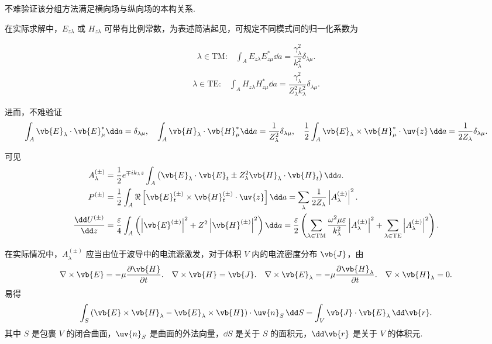 不难验证该分组方法满足横向场与纵向场的本构关系.

在实际求解中，\(E_{z\lambda}\) 或 \(H_{z\lambda}\) 可带有比例常数，为表述简洁起见，可规定不同模式间的归一化系数为

\begin{align*}
	\lambda\in\text{TM:}\quad\int_A E_{z\lambda} E_{z\mu}^* \dd a = \dfrac{\gamma_{\lambda}^2}{k_{\lambda}^2} \delta_{\lambda\mu}.
\end{align*}
\begin{align*}
	\lambda\in\text{TE:}\quad\int_A H_{z\lambda} H_{z\mu}^* \dd a = \dfrac{\gamma_{\lambda}^2}{Z_{\lambda}^2 k_{\lambda}^2} \delta_{\lambda\mu}.
\end{align*}

进而，不难验证
\begin{align*}
	\int_A \vb{E}_{\lambda} \cdot \vb{E}_{\mu}^* \dd a = \delta_{\lambda\mu}, \quad \int_A \vb{H}_{\lambda} \cdot \vb{H}_{\mu}^* \dd a = \dfrac{1}{Z_{\lambda}^2} \delta_{\lambda\mu},\quad \dfrac{1}{2} \int_A \vb{E}_{\lambda} \times \vb{H}_{\mu}^* \cdot \uv{z} \, \dd a = \dfrac{1}{2 Z_{\lambda}} \delta_{\lambda\mu}.
\end{align*}

可见
\begin{align*}
	A_{\lambda}^{(\pm)} &= \dfrac{1}{2} e^{\mp i k_{\lambda} z} \int_A \left( \vb{E}_{\lambda} \cdot \vb{E}_t \pm Z_{\lambda}^2 \vb{H}_{\lambda} \cdot \vb{H}_t \right) \dd a.\\
	P^{(\pm)} &= \dfrac{1}{2} \int_A \Re\left[ \vb{E}_t^{(\pm)} \times \vb{H}_t^{(\pm)} \cdot \uv{z} \right] \dd a = \sum_{\lambda} \dfrac{1}{2 Z_{\lambda}} \left| A_{\lambda}^{(\pm)} \right|^2.\\
	\dfrac{\dd U^{(\pm)}}{\dd z} &= \dfrac{\varepsilon}{4} \int_A \left( \left| \vb{E}^{(\pm)} \right|^2 + Z^2 \left| \vb{H}^{(\pm)} \right|^2 \right) \dd a = \dfrac{\varepsilon}{2} \left( \sum_{\lambda \in \text{TM}} \dfrac{\omega^2 \mu\varepsilon}{k_{\lambda}^2} \left| A_{\lambda}^{(\pm)} \right|^2 + \sum_{\lambda \in \text{TE}} \left| A_{\lambda}^{(\pm)} \right|^2 \right).
\end{align*}

在实际情况中，\(A_{\lambda}^{(\pm)}\) 应当由位于波导中的电流源激发，对于体积 \(V\) 内的电流密度分布 \(\vb{J}\)，由
\begin{align*}
	\nabla \times \vb{E} = -\mu \dfrac{\partial \vb{H}}{\partial t}. \quad \nabla \times \vb{H} = \vb{J}. \quad \nabla \times \vb{E}_{\lambda} = -\mu \dfrac{\partial \vb{H}_{\lambda}}{\partial t}. \quad \nabla \times \vb{H}_{\lambda} = 0.
\end{align*}
易得
\begin{align*}
	\int_S \left( \vb{E} \times \vb{H}_{\lambda} - \vb{E}_{\lambda} \times \vb{H} \right) \cdot \uv{n}_S \, \dd S = \int_V \vb{J} \cdot \vb{E}_{\lambda} \, \dd \vb{r}.
\end{align*}
其中 \(S\) 是包裹 \(V\) 的闭合曲面，\(\uv{n}_S\) 是曲面的外法向量，\(\dd S\) 是关于 \(S\) 的面积元，\(\dd \vb{r}\) 是关于 \(V\) 的体积元.

